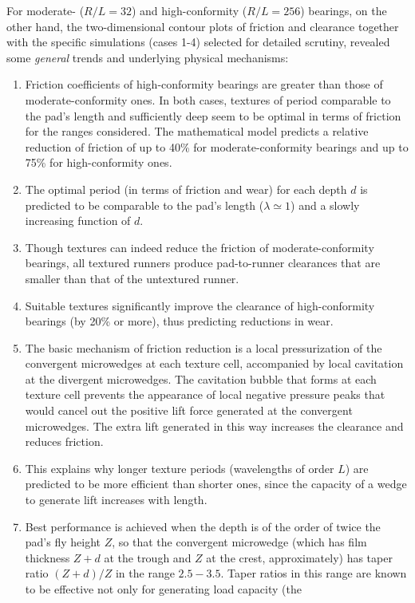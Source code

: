 For moderate- ($R/L = 32$) and high-conformity ($R/L = 256$) bearings,
on the other hand,
the two-dimensional contour plots
of friction and clearance
together with the specific simulations (cases 1-4) selected
for detailed scrutiny, revealed some {\em general} trends and underlying physical
mechanisms:
\begin{enumerate}
\item Friction coefficients of high-conformity bearings are greater
than those of moderate-conformity ones. In both cases, textures of
period comparable to the pad's length and sufficiently deep 
seem to be optimal in terms of friction for the
ranges considered. The mathematical model predicts a
relative reduction of friction
of up to 40\% for moderate-conformity bearings and up to 75\% for
high-conformity ones.
\item The optimal period (in terms of friction and wear)
for each depth $d$ is predicted to be comparable to the 
pad's length ($\lambda \simeq 1$) and a slowly
increasing function of $d$.
\item Though textures can indeed reduce the friction of moderate-conformity
bearings, all textured runners produce pad-to-runner clearances
that are smaller than that of the untextured runner.
\item Suitable textures significantly
improve the clearance of high-conformity bearings (by 20\% or more), 
thus predicting reductions in wear.
\item  The basic mechanism of friction reduction 
is a local pressurization of the convergent
microwedges at each texture cell, accompanied by local cavitation
at the divergent microwedges. The cavitation bubble that forms
at each texture cell prevents the appearance of
local negative pressure peaks that would cancel out the positive
lift force generated at the convergent microwedges. The extra lift
generated in this way increases the clearance and reduces friction.
\item This explains why longer texture periods (wavelengths of order $L$) 
are predicted to be more efficient than shorter ones, since the capacity of
a wedge to generate lift increases with length. 
\item Best performance is achieved when the depth is of the order of
twice the pad's fly height $Z$, so that the convergent microwedge (which
has film thickness $Z+d$ at the trough and $Z$ at the crest, approximately) 
has taper ratio $(Z+d)/Z$ in the range $2.5 - 3.5$. Taper ratios in this range
are known to be effective not only for generating load capacity (the

\end{enumerate}
